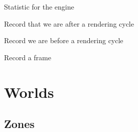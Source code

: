 \documentclass[letterpaper,10pt,english]{sphinxmanual}
\begin{document}
\begin{fulllineitems}
\label{engine:serge.engine.EngineStats}
Statistic for the engine

\begin{fulllineitems}
\label{engine:serge.engine.EngineStats.afterRender}
Record that we are after a rendering cycle

\end{fulllineitems}


\begin{fulllineitems}
\label{engine:serge.engine.EngineStats.beforeRender}
Record we are before a rendering cycle

\end{fulllineitems}


\begin{fulllineitems}
\label{engine:serge.engine.EngineStats.recordFrame}
Record a frame

\end{fulllineitems}


\end{fulllineitems}



\chapter{Worlds}
\label{world:worlds}\label{world::doc}

\section{Zones}
\label{zone:zones}\label{zone:module-zone}\label{zone::doc}
\end{document}
